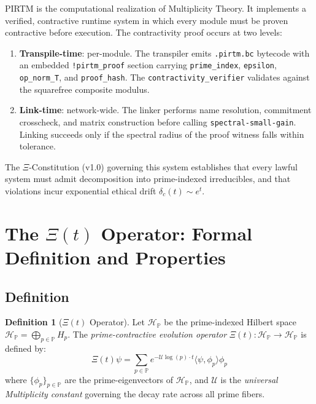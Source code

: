 \documentclass[12pt,letterpaper]{article}
\theoremstyle{definition}
\newtheorem{definition}{Definition}[section]
\theoremstyle{remark}
\begin{document}
PIRTM is the computational realization of Multiplicity Theory. It implements a verified, contractive runtime system in which every module must be proven contractive before execution. The contractivity proof occurs at two levels:

\begin{enumerate}
\item \textbf{Transpile-time}: per-module. The transpiler emits \texttt{.pirtm.bc} bytecode with an embedded \texttt{!pirtm\_proof} section carrying \texttt{prime\_index}, \texttt{epsilon}, \texttt{op\_norm\_T}, and \texttt{proof\_hash}. The \texttt{contractivity\_verifier} validates against the squarefree composite modulus.

\item \textbf{Link-time}: network-wide. The linker performs name resolution, commitment crosscheck, and matrix construction before calling \texttt{spectral-small-gain}. Linking succeeds only if the spectral radius of the proof witness falls within tolerance.
\end{enumerate}

The $\Xi$-Constitution (v1.0) governing this system establishes that every lawful system must admit decomposition into prime-indexed irreducibles, and that violations incur exponential ethical drift $\delta_c(t) \sim e^t$.

\section{The $\Xi(t)$ Operator: Formal Definition and Properties}

\subsection{Definition}

\begin{definition}[$\Xi(t)$ Operator]
Let $\mathcal{H}_\mathbb{P}$ be the prime-indexed Hilbert space $\mathcal{H}_\mathbb{P} = \bigoplus_{p \in \mathbb{P}} H_p$. The \emph{prime-contractive evolution operator} $\Xi(t): \mathcal{H}_\mathbb{P} \to \mathcal{H}_\mathbb{P}$ is defined by:
\begin{equation}
\Xi(t)\psi = \sum_{p \in \mathbb{P}} e^{-\mathcal{U}\log(p)\cdot t} \langle \psi, \phi_p \rangle \phi_p
\end{equation}
where $\{\phi_p\}_{p \in \mathbb{P}}$ are the prime-eigenvectors of $\mathcal{H}_\mathbb{P}$, and $\mathcal{U}$ is the \emph{universal Multiplicity constant} governing the decay rate across all prime fibers.
\end{definition}
\end{document}
